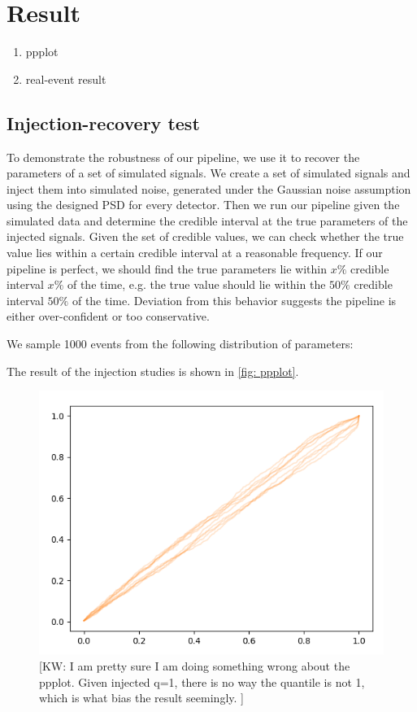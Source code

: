 \documentclass[twocolumn]{aastex631}
\newcommand{\kw}[1]{{\color{rb4}[KW: #1 ]}}
\begin{document}
\section{Result}
\label{sec: Result}

\begin{enumerate}
    \item ppplot
    \item real-event result
\end{enumerate}

\subsection{Injection-recovery test}

To demonstrate the robustness of our pipeline, we use it to recover the
parameters of a set of simulated signals. We create a set of simulated signals
and inject them into simulated noise, generated under the Gaussian noise
assumption using the designed PSD for every detector. Then we run our pipeline
given the simulated data and determine the credible interval at the true
parameters of the injected signals. Given the set of credible values, we can
check whether the true value lies within a certain credible interval at a
reasonable frequency. If our pipeline is perfect, we should find the true
parameters lie within $x\%$ credible interval $x\%$ of the time, e.g. the true
value should lie within the $50\%$ credible interval $50\%$ of the time.
Deviation from this behavior suggests the pipeline is either over-confident or
too conservative.

We sample 1000 events from the following distribution of parameters:


The result of the injection studies is shown in \ref{fig: ppplot}.

\begin{figure}
    \includegraphics[width=0.99\linewidth]{static/ppplot.png}
    \caption{ \kw{I am pretty sure I am doing something wrong about the ppplot.
        Given injected q=1, there is no way the quantile is not 1, which is what
        bias the result seemingly.} }
    \label{fig:ppplot}
    \end{figure}
\end{document}
